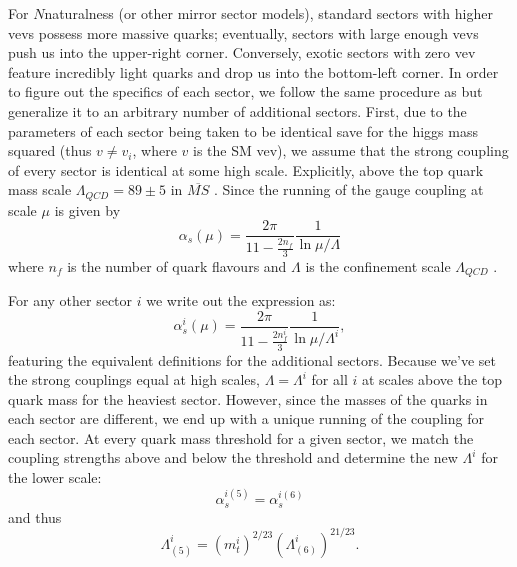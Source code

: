 \documentclass[nofootinbib,twocolumn,preprintnumbers]{revtex4-2}
\begin{document}
For $N$naturalness (or other mirror sector models), standard sectors with higher vevs possess more massive quarks; eventually, sectors with large enough vevs push us into the upper-right corner. Conversely, exotic sectors with zero vev feature incredibly light quarks and drop us into the bottom-left corner. In order to figure out the specifics of each sector, we follow  the same procedure as \cite{Cui:2011wk} but generalize it to an arbitrary number of additional sectors. First, due to the parameters of each sector being taken to be identical save for the higgs mass squared (thus $v \neq v_i$, where $v$ is the SM vev), we assume that the strong coupling of every sector is identical at some high scale. 
Explicitly, above the top quark mass scale $\Lambda_{QCD} = 89 \pm 5$ in $\overline{MS}$ \cite{PhysRevD.98.030001}. Since the running of the gauge coupling at scale $\mu$ is given by 
\begin{equation}\label{eqn:QCDrunning}
\alpha_s (\mu) = \frac{2\pi}{11-\frac{2n_f}{3}}\frac{1}{\ln{\mu/\Lambda}}
\end{equation} 
where $n_f$ is the number of quark flavours and $\Lambda$ is the confinement scale $\Lambda_{QCD}$ \cite{Peskin:1995ev}. 

For any other sector $i$ we write out the expression as: 
\begin{equation}\label{eqn:QCDrunningi}
\alpha_{s}^i (\mu) = \frac{2\pi}{11-\frac{2n^i_f}{3}}\frac{1}{\ln{\mu/\Lambda^i}},
\end{equation}
featuring the equivalent definitions for the additional sectors. Because we've set the strong couplings equal at high scales, $\Lambda = \Lambda^i$ for all $i$ at scales above the top quark mass for the heaviest sector. However, since the masses of the quarks in each sector are different, we end up with a unique running of the coupling for each sector. At every quark mass threshold for a given sector, we match the coupling strengths above and below the threshold and determine the new $\Lambda^i$ for the lower scale:
\begin{equation}
\alpha_s^{i(5)} = \alpha_s^{i(6)}
\end{equation} 
and thus
\begin{equation}
\Lambda_{(5)}^i = (m_t^{i})^{2/23}(\Lambda_{(6)}^i)^{21/23}.
\end{equation}
\end{document}
